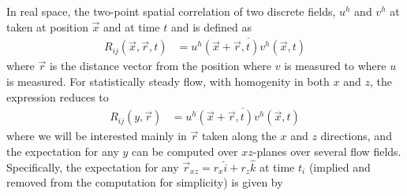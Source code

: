 \documentclass[letterpaper,11pt,nointlimits,reqno]{amsart}
\begin{document}
In real space, the two-point spatial correlation of two discrete fields, $u^h$ and
$v^h$ at taken at position $\vec{x}$ and at time $t$ and is defined as 
%
\begin{equation}
\begin{aligned}
R_{ij} \left( \vec{x}, \vec{r}, t \right) 
  &=   \overline{ 
       u^h \left( \vec{x}+ \vec{r}, t \right)  
       v^h \left( \vec{x}         , t \right) 
       }
\end{aligned}
\end{equation}
%
where $\vec{r}$ is the distance vector from the position where $v$ is measured
to where $u$ is measured. For statistically steady flow, with homogenity in 
both $x$ and $z$, the expression reduces to  
%
\begin{equation}
\begin{aligned}
R_{ij} \left( y, \vec{r} \right) 
  &=   \overline{
       u^h \left( \vec{x}+ \vec{r}, t \right)
       v^h \left( \vec{x}         , t \right) 
       }
\end{aligned}
\end{equation}
%
where we will be interested mainly in $\vec{r}$ taken along the $x$ and 
$z$ directions, and the expectation for any $y$ can be computed over 
$xz$-planes over several flow fields. Specifically, the expectation 
for any $\vec{r}_{xz} = r_x \hat{i} + r_z \hat{k}$ at time $t_i$ (implied and
removed from the computation for simplicity) is given by
%
\end{document}
